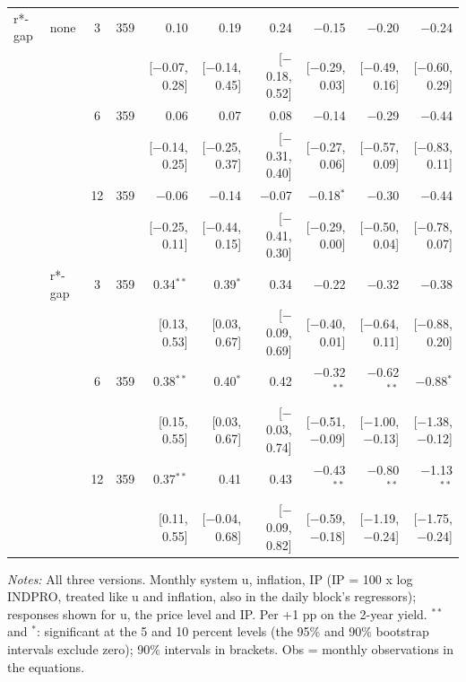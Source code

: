 \begin{longtable}{llcrrrrrrr}
\addlinespace
r*-gap & none & 3 & 359 & 0.10 & 0.19 & 0.24 & $-$0.15 & $-$0.20 & $-$0.24\\
 & & & & {\scriptsize [$-$0.07, 0.28]} & {\scriptsize [$-$0.14, 0.45]} & {\scriptsize [$-$0.18, 0.52]} & {\scriptsize [$-$0.29, 0.03]} & {\scriptsize [$-$0.49, 0.16]} & {\scriptsize [$-$0.60, 0.29]}\\
 &  & 6 & 359 & 0.06 & 0.07 & 0.08 & $-$0.14 & $-$0.29 & $-$0.44\\
 & & & & {\scriptsize [$-$0.14, 0.25]} & {\scriptsize [$-$0.25, 0.37]} & {\scriptsize [$-$0.31, 0.40]} & {\scriptsize [$-$0.27, 0.06]} & {\scriptsize [$-$0.57, 0.09]} & {\scriptsize [$-$0.83, 0.11]}\\
 &  & 12 & 359 & $-$0.06 & $-$0.14 & $-$0.07 & $-$0.18$^{*}$ & $-$0.30 & $-$0.44\\
 & & & & {\scriptsize [$-$0.25, 0.11]} & {\scriptsize [$-$0.44, 0.15]} & {\scriptsize [$-$0.41, 0.30]} & {\scriptsize [$-$0.29, 0.00]} & {\scriptsize [$-$0.50, 0.04]} & {\scriptsize [$-$0.78, 0.07]}\\
 & r*-gap & 3 & 359 & 0.34$^{**}$ & 0.39$^{*}$ & 0.34 & $-$0.22 & $-$0.32 & $-$0.38\\
 & & & & {\scriptsize [0.13, 0.53]} & {\scriptsize [0.03, 0.67]} & {\scriptsize [$-$0.09, 0.69]} & {\scriptsize [$-$0.40, 0.01]} & {\scriptsize [$-$0.64, 0.11]} & {\scriptsize [$-$0.88, 0.20]}\\
 &  & 6 & 359 & 0.38$^{**}$ & 0.40$^{*}$ & 0.42 & $-$0.32$^{**}$ & $-$0.62$^{**}$ & $-$0.88$^{*}$\\
 & & & & {\scriptsize [0.15, 0.55]} & {\scriptsize [0.03, 0.67]} & {\scriptsize [$-$0.03, 0.74]} & {\scriptsize [$-$0.51, $-$0.09]} & {\scriptsize [$-$1.00, $-$0.13]} & {\scriptsize [$-$1.38, $-$0.12]}\\
 &  & 12 & 359 & 0.37$^{**}$ & 0.41 & 0.43 & $-$0.43$^{**}$ & $-$0.80$^{**}$ & $-$1.13$^{**}$\\
 & & & & {\scriptsize [0.11, 0.55]} & {\scriptsize [$-$0.04, 0.68]} & {\scriptsize [$-$0.09, 0.82]} & {\scriptsize [$-$0.59, $-$0.18]} & {\scriptsize [$-$1.19, $-$0.24]} & {\scriptsize [$-$1.75, $-$0.24]}\\
\end{longtable}
\begin{flushleft}\footnotesize\textit{Notes:} All three versions. Monthly system u, inflation, IP (IP = 100 x log INDPRO, treated like u and inflation, also in the daily block's regressors); responses shown for u, the price level and IP. Per +1 pp on the 2-year yield. $^{**}$ and $^{*}$: significant at the 5 and 10 percent levels (the 95\% and 90\% bootstrap intervals exclude zero); 90\% intervals in brackets. Obs = monthly observations in the equations.\end{flushleft}
\endgroup
